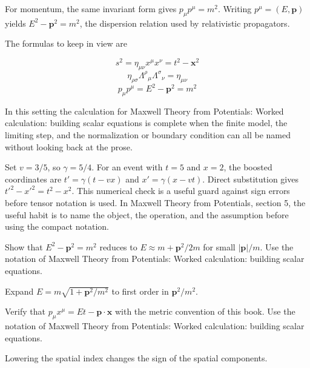 For momentum, the same invariant form gives \(p_\mu p^\mu=m^2\).  Writing \(p^\mu=(E,\bm p)\) yields \(E^2-\bm p^2=m^2\), the dispersion relation used by relativistic propagators.

The formulas to keep in view are

\[
  s^2=\eta_{\mu\nu}x^\mu x^\nu=t^2-\bm x^2
\]
\[
  \eta_{\rho\sigma}\Lambda^\rho{}_\mu\Lambda^\sigma{}_\nu=\eta_{\mu\nu}
\]
\[
  p_\mu p^\mu=E^2-\bm p^2=m^2
\]

In this setting the calculation for Maxwell Theory from Potentials: Worked calculation: building scalar equations is complete when the finite model, the limiting step, and the normalization or boundary condition can all be named without looking back at the prose.




\begin{example}
Set \(v=3/5\), so \(\gamma=5/4\).  For an event with \(t=5\) and \(x=2\), the boosted coordinates are \(t'=\gamma(t-vx)\) and \(x'=\gamma(x-vt)\).  Direct substitution gives \(t'^2-x'^2=t^2-x^2\).  This numerical check is a useful guard against sign errors before tensor notation is used.  In Maxwell Theory from Potentials, section 5, the useful habit is to name the object, the operation, and the assumption before using the compact notation.
\end{example}



\begin{exercise}
Show that \(E^2-\bm p^2=m^2\) reduces to \(E\approx m+\bm p^2/2m\) for small \(|\bm p|/m\).  Use the notation of Maxwell Theory from Potentials: Worked calculation: building scalar equations.
\begin{answer}
Expand \(E=m\sqrt{1+\bm p^2/m^2}\) to first order in \(\bm p^2/m^2\).
\end{answer}
\end{exercise}

\begin{exercise}
Verify that \(p_\mu x^\mu=Et-\bm p\cdot\bm x\) with the metric convention of this book.  Use the notation of Maxwell Theory from Potentials: Worked calculation: building scalar equations.
\begin{answer}
Lowering the spatial index changes the sign of the spatial components.
\end{answer}
\end{exercise}



